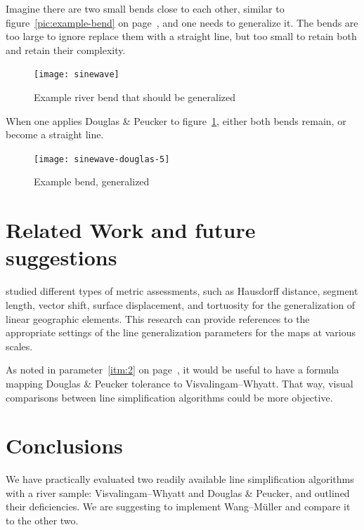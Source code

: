 \documentclass[a4paper]{article}
\newcommand{\DP}{Douglas \& Peucker}
\newcommand{\VW}{Visvalingam--Whyatt}
\newcommand{\WM}{Wang--M{\"u}ller}
\begin{document}
Imagine there are two small bends close to each other, similar to
figure~\ref{pic:example-bend} on page~\pageref{pic:example-bend}, and one needs
to generalize it. The bends are too large to ignore replace them with a
straight line, but too small to retain both and retain their complexity.

\begin{figure}[h]
    \centering
    \texttt{[image: sinewave]}
    \caption{Example river bend that should be generalized}
    \label{pic:sinewave}
\end{figure}

When one applies {\DP} to figure~\ref{pic:sinewave}, either both bends remain,
or become a straight line.

\begin{figure}[h]
    \centering
    \texttt{[image: sinewave-douglas-5]}
    \caption{Example bend, generalized}
    \label{pic:sinewave-douglas-5}
\end{figure}

\section{Related Work and future suggestions}
\label{sec:related_work}

\cite{stanislawski2012automated} studied different types of metric assessments,
such as Hausdorff distance, segment length, vector shift, surface displacement,
and tortuosity for the generalization of linear geographic elements. This
research can provide references to the appropriate settings of the line
generalization parameters for the maps at various scales.

As noted in parameter~\ref{itm:2} on page~\pageref{itm:2}, it would be useful
to have a formula mapping {\DP} tolerance to {\VW}. That way, visual
comparisons between line simplification algorithms could be more objective.

\section{Conclusions}
\label{sec:conclusions}

We have practically evaluated two readily available line simplification
algorithms with a river sample: {\VW} and {\DP}, and outlined their
deficiencies. We are suggesting to implement {\WM} and compare it to the other
two.

\printbibliography
\end{document}
